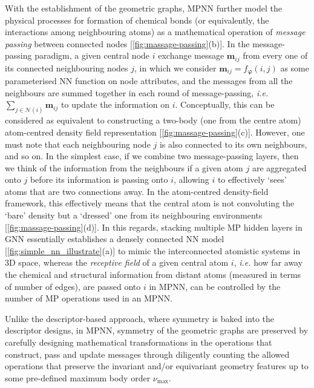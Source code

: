 With the establishment of the geometric graphs, MPNN further model the physical processes for formation of chemical bonds (or equivalently, the interactions among neighbouring atoms) as a mathematical operation of \emph{message passing} between connected nodes [\cref{fig:massage-passing}(b)]. In the message-passing paradigm, a given central node $i$ exchange message $\bm{m}_{ij}$ from every one of its connected neighbouring nodes $j$, in which we consider $\bm{m}_{ij}=f_{\boldsymbol{\varphi}}(i,j)$  as some parameterised NN function on node attributes, and the messages from all the neighbours are summed together in each round of message-passing, \emph{i.e.} $\sum_{j\in\mathcal{N}(i)}\bm{m}_{ij}$ to update the information on $i$. Conceptually, this can be considered as equivalent to constructing a two-body (one from the centre atom) atom-centred density field representation  [\cref{fig:massage-passing}(c)]. However, one must note that each neighbouring node $j$ is also connected to its own neighbours, and so on. In the simplest case, if we combine two message-passing layers, then we think of the information from the neighbours if a given atom $j$ are aggregated onto $j$ before its information is passing onto $i$, allowing $i$ to effectively `sees' atoms that are two connections away. In the atom-centred density-field framework, this effectively means that the central atom is not convoluting the `bare' density but a `dressed' one from its neighbouring environments [\cref{fig:massage-passing}(d)].\cite{nigam2022unified} In this regards, stacking multiple MP hidden layers in GNN essentially establishes a densely connected NN model [\cref{fig:simple_nn_illustrate}(a)] to mimic the interconnected atomistic systems in 3D space, whereas the \emph{receptive field} of a given central atom $i$, \emph{i.e.} how far away the chemical and structural information from distant atoms (measured in terms of number of edges), are passed onto $i$ in MPNN, can be controlled by the number of MP operations used in an MPNN.

Unlike the descriptor-based approach, where symmetry is baked into the descriptor designs, in MPNN, symmetry of the geometric graphs are preserved by carefully designing  mathematical transformations in the operations that construct, pass and update messages through diligently counting the allowed operations that preserve the invariant and/or equivariant geometry features up to some pre-defined maximum body order $\nu_{\max}$.\cite{duval2023hitchhiker} 




